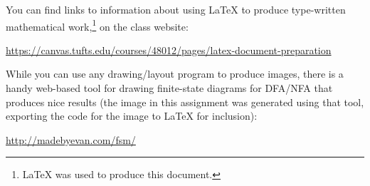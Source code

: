 \documentclass[leqno,11pt]{article}
\begin{document}
\vspace{4pt}\noindent 
You can find links to information about using LaTeX to produce type-written mathematical work,\footnote{LaTeX
was used to produce this document.}  on the class website:
\begin{center}
	\href{https://canvas.tufts.edu/courses/48012/pages/latex-document-preparation}
	{https://canvas.tufts.edu/courses/48012/pages/latex-document-preparation}
\end{center}
While you can use any drawing/layout program to produce images, there is a handy web-based tool for drawing
finite-state diagrams for DFA/NFA that produces nice results (the image in this assignment was generated using
that tool, exporting the code for the image to LaTeX for inclusion):
\begin{center}
	\href{http://madebyevan.com/fsm/}{http://madebyevan.com/fsm/}
\end{center}
 
\end{document}
